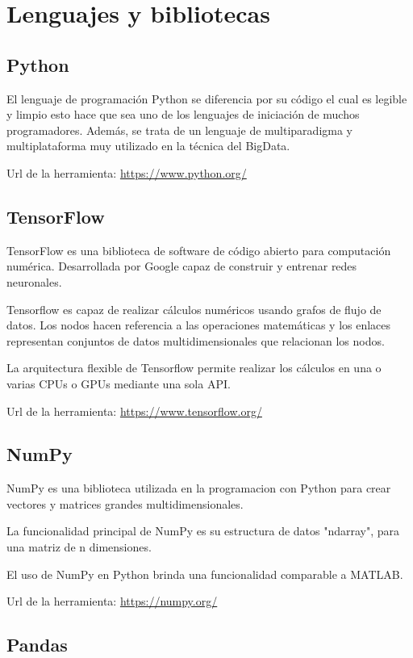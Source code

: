 \section{Lenguajes y bibliotecas}

\subsection{Python}

El lenguaje de programación Python se diferencia por su código el cual es legible y limpio esto hace que sea uno de los lenguajes de iniciación de muchos programadores. Además, se trata de un lenguaje de multiparadigma y multiplataforma muy utilizado en la técnica del BigData.

Url de la herramienta: \url{https://www.python.org/}

\subsection{TensorFlow}

TensorFlow es una biblioteca de software de código abierto para computación numérica. Desarrollada por Google capaz de construir y entrenar redes neuronales.

Tensorflow es capaz de realizar cálculos
numéricos usando grafos de flujo de datos. Los nodos hacen referencia a las operaciones matemáticas y los enlaces representan conjuntos de datos multidimensionales que relacionan los nodos.

La arquitectura flexible de Tensorflow permite realizar los cálculos en una o varias CPUs o GPUs mediante una sola API.

Url de la herramienta: \url{https://www.tensorflow.org/}

\subsection{NumPy}

NumPy es una biblioteca utilizada en la programacion con Python para crear vectores y matrices grandes multidimensionales.

La funcionalidad principal de NumPy es su estructura de datos "ndarray", para una matriz de n dimensiones.

El uso de NumPy en Python brinda una funcionalidad comparable a MATLAB.

Url de la herramienta: \url{https://numpy.org/}

\subsection{Pandas}

